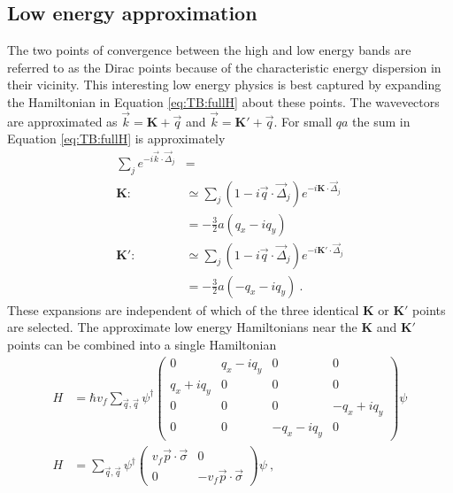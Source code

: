 \subsection{Low energy approximation}
The two points of convergence between the high and low energy bands are referred to as the Dirac points because of the characteristic energy dispersion in their vicinity.
This interesting low energy physics is best captured by expanding the Hamiltonian in Equation \ref{eq:TB:fullH} about these points.
The wavevectors are approximated as $\vec{k}=\bm{K}+\vec{q}$ and $\vec{k}=\bm{K'}+\vec{q}$.
For small $qa$ the sum in Equation \ref{eq:TB:fullH} is approximately
\begin{align}
	\sum_{j} e^{-i \vec{k} \cdot \vec{\Delta}_j}&= \nonumber \\
	\bm{K:}\ 	&\simeq \sum_{j} (1-i \vec{q} \cdot \vec{\Delta}_j) e^{-i \bm{K} \cdot \vec{\Delta}_j} \nonumber \\
				&=-\frac{3}{2} a \left( q_x-i q_y \right) \nonumber \\
	\bm{K':}\	&\simeq \sum_{j} (1-i \vec{q} \cdot \vec{\Delta}_j) e^{-i \bm{K'} \cdot \vec{\Delta}_j} \nonumber \\
				&=-\frac{3}{2} a \left(-q_x-i q_y \right) \ .
	\label{eq:TB:LowEnergy} 
\end{align}
These expansions are independent of which of the three identical $\bm{K}$ or $\bm{K'}$ points are selected.
The approximate low energy Hamiltonians near the $\bm{K}$ and $\bm{K'}$ points can be combined into a single Hamiltonian
\begin{align}
	H&=\hbar v_f \sum_{\vec q, \vec{q}}
		\psi^{\dagger}
		\left( \begin{array}{cccc}
			0              & q_x - i q_y & 0            & 0 \\
			q_x+i q_y      & 0           & 0            & 0 \\                            
			0              & 0           & 0            & -q_x+i q_y \\
			0              & 0           & -q_x-i q_y & 0			            			\end{array} \right)
		\psi \nonumber \\
	H&=\sum_{\vec q, \vec{q}}
		\psi^{\dagger}
		\left( \begin{array}{cc}
			v_f \vec{p} \cdot \vec{\sigma}              & 0\\
			0              & -v_f \vec{p} \cdot \vec{\sigma}			   	            			\end{array} \right)
		\psi \ ,
	\label{eq:TB:FullH}
\end{align}
